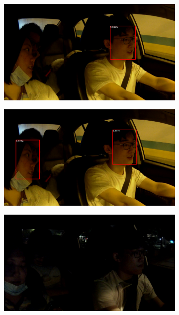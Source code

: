 \begin{figure}[t]
\centering
\begin{subfigure}[b]{0.45\textwidth}
    \includegraphics[width=\textwidth]{figures/comp_base1}
\end{subfigure}
\begin{subfigure}[b]{0.45\textwidth}
    \includegraphics[width=\textwidth]{figures/comp_ours1}
\end{subfigure}
\begin{subfigure}[b]{0.45\textwidth}
    \includegraphics[width=\textwidth]{figures/comp_base2}

\end{subfigure}
\end{figure}
